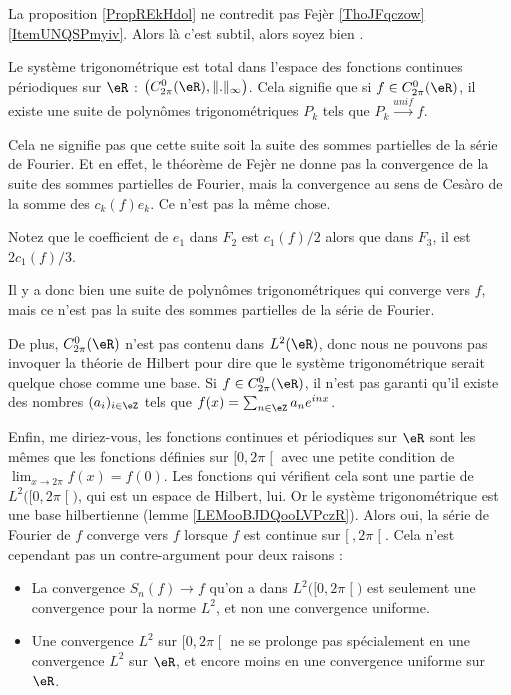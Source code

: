 \begin{normaltext}      \label{NORMooGKKWooFmOBeE}
    La proposition \ref{PropREkHdol} ne contredit pas Fejèr \ref{ThoJFqczow}\ref{ItemUNQSPmyiv}. Alors là c'est subtil, alors soyez bien .
    
    Le système trigonométrique est total dans l'espace des fonctions continues périodiques sur \( \eR\) : \( \big(  C^0_{2\pi}(\eR),\| . \|_{\infty}\big)\). Cela signifie que si \( f\in C^0_{2\pi}(\eR)\), il  existe une suite de polynômes trigonométriques \( P_k\) tels que \( P_k\stackrel{unif}{\longrightarrow}f\).

    Cela ne signifie pas que cette suite soit la suite des sommes partielles de la série de Fourier. Et en effet, le théorème de Fejèr ne donne pas la convergence de la suite des sommes partielles de Fourier, mais la convergence au sens de Cesàro de la somme des \( c_k(f)e_k\). Ce n'est pas la même chose.

    Notez que le coefficient de \( e_1\) dans \( F_2\) est \( c_1(f)/2\) alors que dans \( F_3\), il est \( 2c_1(f)/3\).

    Il y a donc bien une suite de polynômes trigonométriques qui converge vers \( f\), mais ce n'est pas la suite des sommes partielles de la série de Fourier.

    De plus, \( C^0_{2\pi}(\eR)\) n'est pas contenu dans \( L^2(\eR)\), donc nous ne pouvons pas invoquer la théorie de Hilbert pour dire que le système trigonométrique serait quelque chose comme une base. Si \( f\in C^0_{2\pi}(\eR)\), il n'est pas garanti qu'il existe des nombres \( (a_i)_{i\in \eZ}\) tels que \( f(x)=\sum_{n\in \eZ}a_n e^{inx}\).

    Enfin, me diriez-vous, les fonctions continues et périodiques sur \( \eR\) sont les mêmes que les fonctions définies sur \( \mathopen[ 0 , 2\pi \mathclose[\) avec une petite condition de \( \lim_{x\to 2\pi} f(x)=f(0)\). Les fonctions qui vérifient cela sont une partie de \( L^2\big( \mathopen[ 0 , 2\pi \mathclose[ \big)\), qui est un espace de Hilbert, lui. Or le système trigonométrique est une base hilbertienne (lemme \ref{LEMooBJDQooLVPczR}). Alors oui, la série de Fourier de \( f\) converge vers \( f\) lorsque \( f\) est continue sur \( \mathopen[ \ , 2\pi \mathclose[\). Cela n'est cependant pas un contre-argument pour deux raisons :
        \begin{itemize}
            \item La convergence \( S_n(f)\to f\) qu'on a dans \( L^2\big( \mathopen[ 0 , 2\pi \mathclose[ \big)\) est seulement une convergence pour la norme \( L^2\), et non une convergence uniforme.
                \item
                    Une convergence \( L^2\) sur \( \mathopen[ 0 , 2\pi \mathclose[\) ne se prolonge pas spécialement en une convergence \( L^2\) sur \( \eR\), et encore moins en une convergence uniforme sur \( \eR\).
        \end{itemize}
\end{normaltext}


